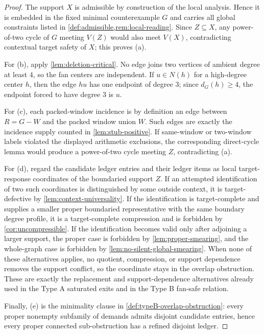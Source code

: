 \documentclass[11pt]{article}
\begin{document}
\begin{proof}
The support $X$ is admissible by construction of the local analysis.  Hence it
is embedded in the fixed minimal counterexample $G$ and carries all global
constraints listed in \cref{def:admissible,rem:local-reading}.  Since
$Z\subseteq X$, any power-of-two cycle of $G$ meeting $V(Z)$ would also meet
$V(X)$, contradicting contextual target safety of $X$; this proves (a).

For (b), apply \cref{lem:deletion-critical}.  No edge joins two vertices of
ambient degree at least $4$, so the fan centers are independent.  If
$u\in N(h)$ for a high-degree center $h$, then the edge $hu$ has one endpoint
of degree $3$; since $d_G(h)\ge4$, the endpoint forced to have degree $3$ is
$u$.

For (c), each packed-window incidence is by definition an edge between
$R=G-W$ and the packed window union $W$.  Such edges are exactly the incidence
supply counted in \cref{lem:stub-positive}.  If same-window or two-window labels
violated the displayed arithmetic exclusions, the corresponding direct-cycle
lemma would produce a power-of-two cycle meeting $Z$, contradicting (a).

For (d), regard the candidate ledger entries and their ledger items as local
target-response coordinates of the boundaried support $Z$.  If an attempted
identification of two such coordinates is distinguished by some outside
context, it is target-defective by \cref{lem:context-universality}.  If the
identification is target-complete and supplies a smaller proper boundaried
representative with the same boundary degree profile, it is a target-complete
compression and is forbidden by \cref{cor:uncompressible}.  If the
identification becomes valid only after adjoining a larger support, the proper
case is forbidden by \cref{lem:proper-smearing}, and the whole-graph case is
forbidden by \cref{lem:no-silent-global-smearing}.  When none of these
alternatives applies, no quotient, compression, or support dependence removes the
support conflict, so the coordinate stays in the overlap obstruction.  These are
exactly the replacement and support-dependence alternatives already used in the Type
A saturated exits and in the Type B fan-safe relation.

Finally, (e) is the minimality clause in
\cref{def:typeB-overlap-obstruction}: every proper nonempty subfamily of
demands admits disjoint candidate entries, hence every proper connected
sub-obstruction has a refined disjoint ledger.
\end{proof}
\end{document}
